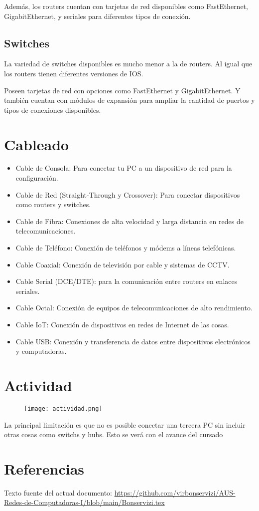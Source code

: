 \documentclass[11pt, a4paper]{article}
\begin{document}
Además, los routers cuentan con tarjetas de red disponibles como FastEthernet, GigabitEthernet, y seriales para diferentes tipos de conexión.

\subsection{Switches}

La variedad de switches disponibles es mucho menor a la de routers. Al igual que los routers tienen diferentes versiones de IOS. 

Poseen tarjetas de red con opciones como FastEthernet y GigabitEthernet. Y también cuentan con módulos de expansión para ampliar la cantidad de puertos y tipos de conexiones disponibles.

\section{Cableado}

\begin{itemize}
    \item Cable de Consola: Para conectar tu PC a un dispositivo de red para la configuración.
    \item Cable de Red (Straight-Through y Crossover): Para conectar dispositivos como routers y switches.
    \item Cable de Fibra: Conexiones de alta velocidad y larga distancia en redes de telecomunicaciones.
     \item Cable de Teléfono: Conexión de teléfonos y módems a líneas telefónicas.
    \item Cable Coaxial: Conexión de televisión por cable y sistemas de CCTV.
    \item Cable Serial (DCE/DTE): para la comunicación entre routers en enlaces seriales.
    \item Cable Octal: Conexión de equipos de telecomunicaciones de alto rendimiento.
    \item Cable IoT: Conexión de dispositivos en redes de Internet de las cosas.
    \item Cable USB: Conexión y transferencia de datos entre dispositivos electrónicos y computadoras.
\end{itemize}


\section{Actividad}

\begin{figure} [H]
    \centering
    \texttt{[image: actividad.png]}
\end{figure}
La principal limitación es que no es posible conectar una tercera PC sin incluir otras cosas como switchs y hubs. Esto se verá con el avance del cursado

\section{Referencias}

Texto fuente del actual documento: \href{https://github.com/virbonservizi/AUS-Redes-de-Computadoras-I/blob/main/Bonservizi.tex}{https://github.com/virbonservizi/AUS-Redes-de-Computadoras-I/blob/main/Bonservizi.tex}
\end{document}
